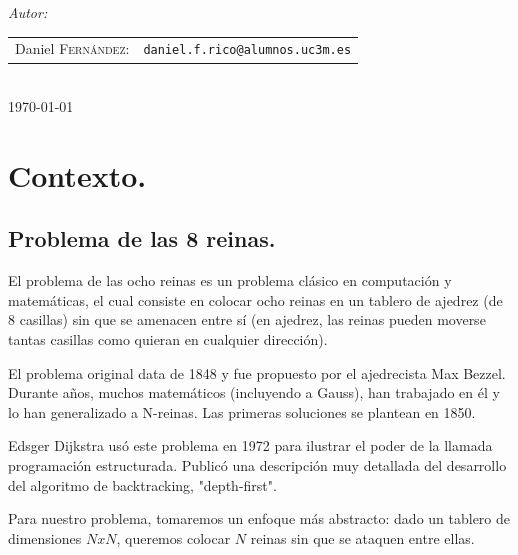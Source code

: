 \documentclass[12pt]{article}
\begin{document}
\begin{titlepage}
\emph{Autor:}\\[0.7cm]

\begin{tabular}{rl}
    Daniel \textsc{Fernández}: &\texttt{daniel.f.rico@alumnos.uc3m.es}
\end{tabular}\\[2cm]



{\large \today}\\[3cm] %

\vfill %

\end{titlepage}

\tableofcontents

\newpage

\section{Contexto.}

\subsection{Problema de las 8 reinas.}

El problema de las ocho reinas es un problema clásico en computación y matemáticas, el cual consiste en colocar ocho reinas en un tablero de ajedrez (de 8 casillas) sin que se amenacen entre sí (en ajedrez, las reinas pueden moverse tantas casillas como quieran en cualquier dirección).
 
El problema original data de 1848 y fue propuesto por el ajedrecista Max Bezzel. Durante años, muchos matemáticos (incluyendo a Gauss), han trabajado en él y lo han generalizado a N-reinas. 
Las primeras soluciones se plantean en 1850.

Edsger Dijkstra usó este problema en 1972 para ilustrar el poder de la llamada programación estructurada. Publicó una descripción muy detallada del desarrollo del algoritmo de backtracking, "depth-first".

Para nuestro problema, tomaremos un enfoque más abstracto: dado un tablero de dimensiones $NxN$, queremos colocar $N$ reinas sin que se ataquen entre ellas.
\end{document}
